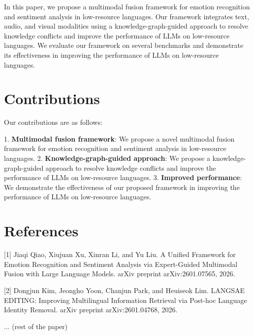 \documentclass{article}
\begin{document}
In this paper, we propose a multimodal fusion framework for emotion recognition and sentiment analysis in low-resource languages. Our framework integrates text, audio, and visual modalities using a knowledge-graph-guided approach to resolve knowledge conflicts and improve the performance of LLMs on low-resource languages. We evaluate our framework on several benchmarks and demonstrate its effectiveness in improving the performance of LLMs on low-resource languages.

\section{Contributions}

Our contributions are as follows:

1.  \textbf{Multimodal fusion framework}: We propose a novel multimodal fusion framework for emotion recognition and sentiment analysis in low-resource languages.
2.  \textbf{Knowledge-graph-guided approach}: We propose a knowledge-graph-guided approach to resolve knowledge conflicts and improve the performance of LLMs on low-resource languages.
3.  \textbf{Improved performance}: We demonstrate the effectiveness of our proposed framework in improving the performance of LLMs on low-resource languages.

\section{References}

[1] Jiaqi Qiao, Xiujuan Xu, Xinran Li, and Yu Liu. A Unified Framework for Emotion Recognition and Sentiment Analysis via Expert-Guided Multimodal Fusion with Large Language Models. arXiv preprint arXiv:2601.07565, 2026.

[2] Dongjun Kim, Jeongho Yoon, Chanjun Park, and Heuiseok Lim. LANGSAE EDITING: Improving Multilingual Information Retrieval via Post-hoc Language Identity Removal. arXiv preprint arXiv:2601.04768, 2026.

... (rest of the paper)
\end{document}
